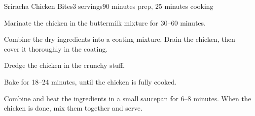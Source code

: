 \documentclass[../Cookbook.tex]{subfiles}
\begin{document}
\begin{recipe}{Sriracha Chicken Bites}{3 servings}{90 minutes prep, 25 minutes cooking}

	Marinate the chicken in the buttermilk mixture for 30--60 minutes.

	Combine the dry ingredients into a coating mixture. Drain the chicken, then cover it thoroughly in the coating.

	Dredge the chicken in the crunchy stuff.

	Bake for 18--24 minutes, until the chicken is fully cooked.

	Combine and heat the ingredients in a small saucepan for 6--8 minutes. When the chicken is done, mix them together and serve.

\end{recipe}
\end{document}
